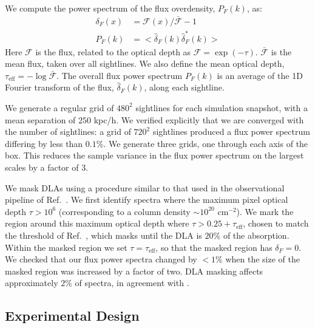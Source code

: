 \documentclass[a4paper,11pt]{article}
\begin{document}
We compute the power spectrum of the flux overdensity, $P_F(k)$, as:
\begin{align}
 \delta_F(x) &= \mathcal{F}(x) / \bar{\mathcal{F}} - 1 \\
 P_F(k) &= < \hat{\delta}_F(k) \hat{\delta}_F^*(k) >
\end{align}
Here $\mathcal{F}$ is the flux, related to the optical depth as $\mathcal{F} = \exp{(-\tau)}$. $\bar{\mathcal{F}}$ is the mean flux, taken over all sightlines. We also define the mean optical depth, $\tau_\mathrm{eff} = -\log \bar{\mathcal{F}}$. The overall flux power spectrum $P_F(k) $ is an average of the 1D Fourier transform of the flux, $\hat{\delta}_F(k)$, along each sightline.

We generate a regular grid of $480^2$ sightlines for each simulation snapshot, with a mean separation of $250$ kpc/h. We verified explicitly that we are converged with the number of sightlines: a grid of $720^2$ sightlines produced a flux power spectrum differing by less than $0.1\%$. We generate three grids, one through each axis of the box. This reduces the sample variance in the flux power spectrum on the largest scales by a factor of $3$.

We mask DLAs using a procedure similar to that used in the observational pipeline of Ref.~\cite{Chabanier:2020}. We first identify spectra where the maximum pixel optical depth $\tau > 10^6$ (corresponding to a column density $\sim 10^{20}$ cm$^{-2}$). We mark the region around this maximum optical depth where $\tau > 0.25 + \tau_\mathrm{eff}$, chosen to match the threshold of Ref.~\cite{Chabanier:2020}, which masks until the DLA is $20\%$ of the absorption. Within the masked region we set $\tau = \tau_\mathrm{eff}$, so that the masked region has $\delta_F = 0$. We checked that our flux power spectra changed by $< 1\%$ when the size of the masked region was increased by a factor of two. DLA masking affects approximately $2\%$ of spectra, in agreement with \cite{Rogers:2019}.

\subsection{Experimental Design}
\label{sec:latinhypercube}
\end{document}
